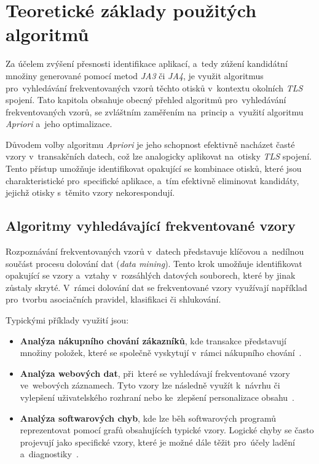 \chapter{Teoretické základy použitých algoritmů}
\label{chp: algos}
Za účelem zvýšení přesnosti identifikace aplikací, a~tedy zúžení kandidátní množiny generované pomocí metod \textit{JA3} či \textit{JA4}, je využit algoritmus pro~vyhledávání frekventovaných vzorů těchto otisků v~kontextu okolních \textit{TLS} spojení. Tato kapitola obsahuje obecný přehled algoritmů pro~vyhledávání frekventovaných vzorů, se zvláštním zaměřením na~princip a~využití algoritmu \textit{Apriori} a~jeho optimalizace.

Důvodem volby algoritmu \textit{Apriori} je jeho schopnost efektivně nacházet časté vzory v~transakčních datech, což lze analogicky aplikovat na~otisky \textit{TLS} spojení. Tento přístup umožňuje identifikovat opakující se kombinace otisků, které jsou charakteristické pro~specifické aplikace, a~tím efektivně eliminovat kandidáty, jejichž otisky s~těmito vzory nekorespondují.

\section{Algoritmy vyhledávající frekventované vzory}
Rozpoznávání frekventovaných vzorů v~datech představuje klíčovou a~nedílnou součást procesu dolování dat (\textit{data mining}). Tento krok umožňuje identifikovat opakující se vzory a~vztahy v~rozsáhlých datových souborech, které by jinak zůstaly skryté. V~rámci dolování dat se frekventované vzory využívají například pro~tvorbu asociačních pravidel, klasifikaci či shlukování. 

Typickými příklady využití jsou:
\begin{itemize}
	\item \textbf{Analýza nákupního chování zákazníků}, kde transakce představují množiny položek, které se společně vyskytují v~rámci nákupního chování~\cite{Aggarwal2014}.
	          
	\item \textbf{Analýza webových dat}, při~které se vyhledávají frekventované vzory ve~webových záznamech. Tyto vzory lze následně využít k~návrhu či vylepšení uživatelského rozhraní nebo ke~zlepšení personalizace obsahu~\cite{WebMining}. 
	          
	\item \textbf{Analýza softwarových chyb}, kde lze běh softwarových programů reprezentovat pomocí grafů obsahujících typické vzory. Logické chyby se často projevují jako specifické vzory, které je možné dále těžit pro~účely ladění a~diagnostiky~\cite{swBugs}.
\end{itemize}

